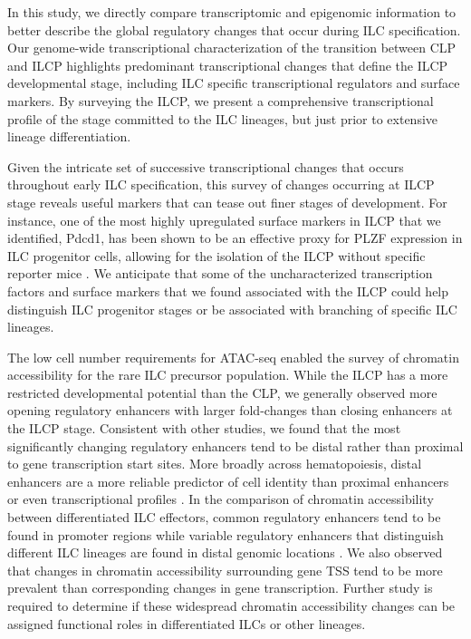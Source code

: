 In this study, we directly compare transcriptomic and epigenomic information to better describe the global regulatory changes that occur during ILC specification. Our genome-wide transcriptional characterization of the transition between CLP and ILCP highlights predominant transcriptional changes that define the ILCP developmental stage, including ILC specific transcriptional regulators and surface markers. By surveying the ILCP, we present a comprehensive transcriptional profile of the stage committed to the ILC lineages, but just prior to extensive lineage differentiation. 

Given the intricate set of successive transcriptional changes that occurs throughout early ILC specification, this survey of changes occurring at ILCP stage reveals useful markers that can tease out finer stages of development. For instance, one of the most highly upregulated surface markers in ILCP that we identified, Pdcd1, has been shown to be an effective proxy for PLZF expression in ILC progenitor cells, allowing for the isolation of the ILCP without specific reporter mice \cite{seillet2016,yu2016}. We anticipate that some of the uncharacterized transcription factors and surface markers that we found associated with the ILCP could help distinguish ILC progenitor stages or be associated with branching of specific ILC lineages. 

The low cell number requirements for ATAC-seq enabled the survey of chromatin accessibility for the rare ILC precursor population. While the ILCP has a more restricted developmental potential than the CLP, we generally observed more opening regulatory enhancers with larger fold-changes than closing enhancers at the ILCP stage. Consistent with other studies, we found that the most significantly changing regulatory enhancers tend to be distal rather than proximal to gene transcription start sites. More broadly across hematopoiesis, distal enhancers are a more reliable predictor of cell identity than proximal enhancers or even transcriptional profiles \cite{corces2016}. In the comparison of chromatin accessibility between differentiated ILC effectors, common regulatory enhancers tend to be found in promoter regions while variable regulatory enhancers that distinguish different ILC lineages are found in distal genomic locations \cite{shih2016}. We also observed that changes in chromatin accessibility surrounding gene TSS tend to be more prevalent than corresponding changes in gene transcription. Further study is required to determine if these widespread chromatin accessibility changes can be assigned functional roles in differentiated ILCs or other lineages. 

